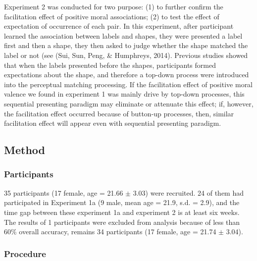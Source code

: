 \documentclass[
  english,
  man]{apa6}
\begin{document}
Experiment 2 was conducted for two purpose: (1) to further confirm the facilitation effect of positive moral associations; (2) to test the effect of expectation of occurrence of each pair. In this experiment, after participant learned the association between labels and shapes, they were presented a label first and then a shape, they then asked to judge whether the shape matched the label or not (see (Sui, Sun, Peng, \& Humphreys, 2014). Previous studies showed that when the labels presented before the shapes, participants formed expectations about the shape, and therefore a top-down process were introduced into the perceptual matching processing. If the facilitation effect of positive moral valence we found in experiment 1 was mainly drive by top-down processes, this sequential presenting paradigm may eliminate or attenuate this effect; if, however, the facilitation effect occurred because of button-up processes, then, similar facilitation effect will appear even with sequential presenting paradigm.

\hypertarget{method-2}{%
\subsection{Method}\label{method-2}}

\hypertarget{participants-3}{%
\subsubsection{Participants}\label{participants-3}}

35 participants (17 female, age = 21.66 \(\pm\) 3.03) were recruited. 24 of them had participated in Experiment 1a (9 male, mean age = 21.9, s.d. = 2.9), and the time gap between these experiment 1a and experiment 2 is at least six weeks. The results of 1 participants were excluded from analysis because of less than 60\% overall accuracy, remains 34 participants (17 female, age = 21.74 \(\pm\) 3.04).

\hypertarget{procedure-3}{%
\subsubsection{Procedure}\label{procedure-3}}
\end{document}
